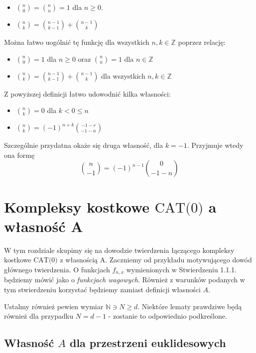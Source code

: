 \documentclass[licencjacka]{pracamgr}
\theoremstyle{definition}
\theoremstyle{definition}
\theoremstyle{definition}
\theoremstyle{definition}
\theoremstyle{definition}
\theoremstyle{plain}
\theoremstyle{plain}
\begin{document}
\begin{itemize}
	\item $ {n \choose 0} = {n \choose n} = 1 $ dla $ n \geq 0 $.
	\item $ {n \choose k} = {n-1 \choose k-1} + {n-1 \choose k} $
\end{itemize}

Można łatwo uogólnić tę funkcję dla wszystkich $ n,k \in \mathbb{Z} $ poprzez relację:

\begin{itemize}
	\item $ {n \choose 0} = 1  $ dla $ n \geq 0$ oraz $ {n \choose n} = 1  $ dla 
	$ n \in \mathbb{Z}$
	\item $ {n \choose k} = {n -1 \choose k-1} + {n-1 \choose k} $ dla wszystkich $ n,k \in
	\mathbb{Z} $
\end{itemize}

Z powyższej definicji łatwo udowodnić kilka własności:

\begin{itemize}
	\item ${n \choose k} = 0$ dla $ k < 0 \leq n $
	\item $ {n \choose k} = (-1)^{n+k}{-1-r \choose -1-n} $
\end{itemize}

Szczególnie przydatna okaże się druga własność, dla $ k = -1 $. Przyjmuje wtedy ona formę 
$$ {n \choose -1} = (-1)^{n-1} {0 \choose -1-n} $$

\chapter{Kompleksy kostkowe $ \text{CAT(0)} $ a własność A}

W tym rozdziale skupimy się na dowodzie twierdzenia łączącego kompleksy kostkowe 
$ \text{CAT(0)} $ z własnością A. Zaczniemy od przykładu motywującego dowód głównego 
twierdzenia. O funkcjach $ f_{n,x} $ wymienionych w Stwierdzeniu 1.1.1. będziemy mówić jako o 
\textit{funkcjach wagowych}. Również z warunków podanych w tym stwierdzeniu korzystać 
będziemy zamiast definicji własności $A$.

Ustalmy również pewien wymiar $\mathbb{N} \ni N \geq d $. 
Niektóre lematy prawdziwe będą również dla przypadku $ N = d-1$ - zostanie to odpowiednio 
podkreślone.

\section{Własność $ A $ dla przestrzeni euklidesowych}
\end{document}
